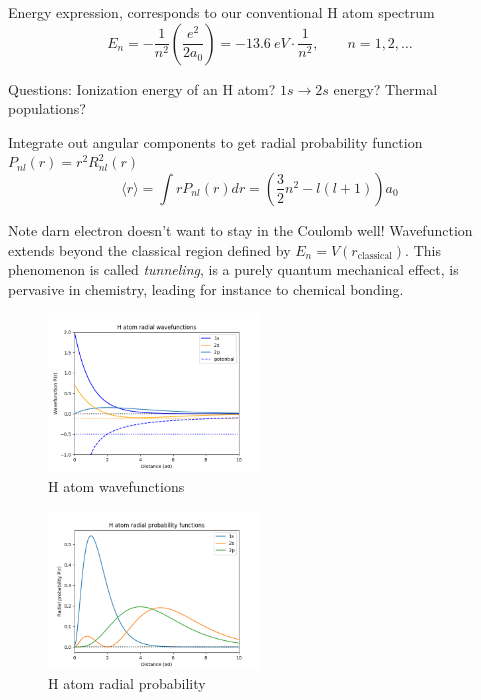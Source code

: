 \documentclass[11pt]{article}
\begin{document}
Energy expression, corresponds to our conventional H atom spectrum
     \[E_n = -\frac{1}{n^2}\left(\frac{e^2}{2 a_0}\right) = -\SI{13.6}{eV}\cdot\frac{1}{n^2},\qquad n = 1,2,\ldots \]

Questions: Ionization energy of an H atom?  \(1s\rightarrow 2s\) energy?  Thermal populations?

Integrate out angular components to get radial probability function \(P_{nl}(r)=r^2 R_{nl}^2(r)\)
    \[\langle r\rangle = \int r P_{nl}(r) dr = \left(\frac{3}{2}n^2-l(l+1)\right)a_0\]

Note darn electron doesn't want to stay in the Coulomb well!
   Wavefunction extends beyond the classical region defined by \(E_n =
   V(r_\text{classical})\).  This phenomenon is called \emph{tunneling}, is
   a purely quantum mechanical effect, is pervasive in chemistry,
   leading for instance to chemical bonding.


\begin{figure}[htbp]
\centering
\includegraphics[width=0.5\textwidth]{./Images/H-R.png}
\caption{H atom wavefunctions}
\end{figure} 
\begin{figure}[htbp]
\centering
\includegraphics[width=0.5\textwidth]{./Images/H-P.png}
\caption{H atom radial probability}
\end{figure} 
\end{document}
